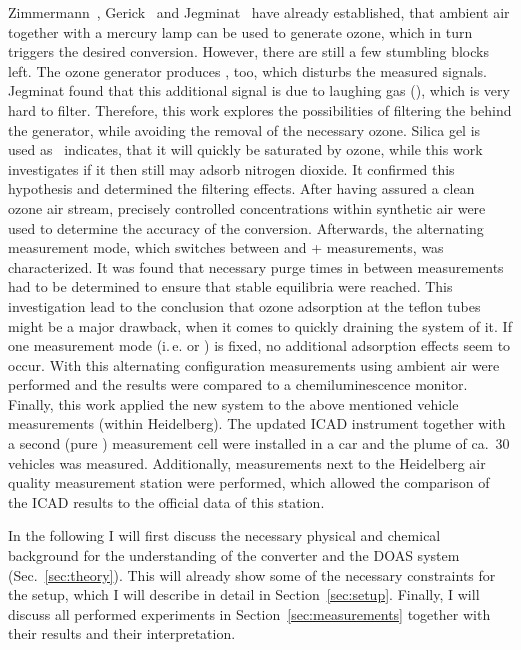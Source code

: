 Zimmermann~\cite{zimmermann}, Gerick~\cite{gerick} and
Jegminat~\cite{bsc} have already established, that ambient air
together with a mercury lamp can be used to generate ozone, which in
turn triggers the desired conversion. However, there are still a few
stumbling blocks left. The ozone generator produces , too,
which disturbs the measured  signals. Jegminat found that
this additional signal is due to laughing gas (), which is
very hard to filter. Therefore, this work explores the possibilities
of filtering the  behind the generator, while avoiding the
removal of the necessary ozone. Silica gel is used
as~\cite{ozone-silica} indicates, that it will quickly be saturated by
ozone, while this work investigates if it then still may adsorb
nitrogen dioxide. It confirmed this hypothesis and determined the
filtering effects. After having assured a clean ozone air stream,
precisely controlled  concentrations within synthetic air were
used to determine the accuracy of the conversion. Afterwards, the
alternating measurement mode, which switches between  and
+ measurements, was characterized. It was found that
necessary purge times in between measurements had to be determined to
ensure that stable equilibria were reached. This investigation lead to
the conclusion that ozone adsorption at the teflon tubes might be a
major drawback, when it comes to quickly draining the system of it. If
one measurement mode (i.\,e.  or ) is fixed, no
additional adsorption effects seem to occur. With this alternating
configuration measurements using ambient air were performed and the
results were compared to a chemiluminescence monitor. Finally, this
work applied the new system to the above mentioned vehicle
measurements (within Heidelberg). The updated ICAD instrument together
with a second (pure ) measurement cell were installed in a car
and the plume of ca.~30 vehicles was measured. Additionally,
measurements next to the Heidelberg air quality measurement station
were performed, which allowed the comparison of the ICAD results to
the official data of this station.

In the following I will first discuss the necessary physical and
chemical background for the understanding of the converter and the
DOAS system (Sec.~\ref{sec:theory}). This will already show some of
the necessary constraints for the setup, which I will describe in
detail in Section~\ref{sec:setup}. Finally, I will discuss all
performed experiments in Section~\ref{sec:measurements} together with
their results and their interpretation.

